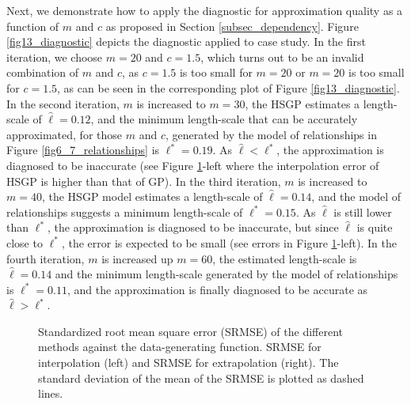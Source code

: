 Next, we demonstrate how to apply the diagnostic for approximation quality as a function of $m$ and $c$ as proposed in Section \ref{subsec_dependency}.
Figure \ref{fig13_diagnostic} depicts the diagnostic applied to case study. In the first iteration, we choose $m=20$ and $c=1.5$, which turns out to be an invalid combination of $m$ and $c$, as $c=1.5$ is too small for $m=20$ or $m=20$ is too small for $c=1.5$, as can be seen in the corresponding plot of Figure \ref{fig13_diagnostic}. In the second iteration, $m$ is increased to $m=30$, the HSGP estimates a length-scale of $\hat{\ell}=0.12$, and the minimum length-scale that can be accurately approximated, for those $m$ and $c$, generated by the model of relationships in Figure \ref{fig6_7_relationships} is $\ell^*=0.19$. As $\hat{\ell} < \ell^*$, the approximation is diagnosed to be inaccurate (see Figure \ref{fig12_MSE_exI_inter}-left where the interpolation error of HSGP is higher than that of GP). In the third iteration, $m$ is increased to $m=40$, the HSGP model estimates a length-scale of $\hat{\ell}=0.14$, and the model of relationships suggests a minimum length-scale of $\ell^*=0.15$. As $\hat{\ell}$ is still lower than $\ell^*$, the approximation is diagnosed to be inaccurate, but since $\hat{\ell}$ is quite close to $\ell^*$, the error is expected to be small (see errors in Figure \ref{fig12_MSE_exI_inter}-left). In the fourth iteration, $m$ is increased up $m=60$, the estimated length-scale is $\hat{\ell}=0.14$ and the minimum length-scale generated by the model of relationships is $\ell^*=0.11$, and the approximation is finally diagnosed to be accurate as $\hat{\ell} > \ell^*$.

\begin{figure}[!t]
\centering
{}
\caption{Standardized root mean square error (SRMSE) of the different methods against the data-generating function. SRMSE for interpolation (left) and SRMSE for extrapolation (right). The standard deviation of the mean of the SRMSE is plotted as dashed lines.}
  \label{fig12_MSE_exI_inter}
\end{figure}


